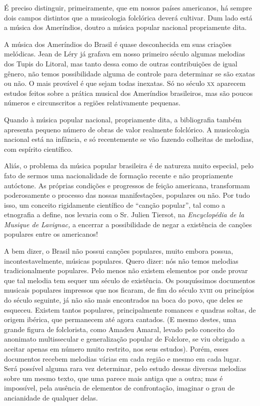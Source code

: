 É preciso distinguir, primeiramente, que em nossos países americanos, há
sempre dois campos distintos que a musicologia folclórica deverá
cultivar. Dum lado está a música dos Ameríndios, doutro a música popular
nacional propriamente dita.

A música dos Ameríndios do Brasil é quase desconhecida em suas criações
melódicas. Jean de Léry já grafava em nosso primeiro século algumas
melodias dos Tupis do Litoral, mas tanto dessa como de outras
contribuições de igual gênero, não temos possibilidade alguma de
controle para determinar se são exatas ou não. O mais provável é que
sejam todas inexatas. Só no século \textsc{xx} aparecem estudos feitos sobre a
prática musical dos Ameríndios brasileiros, mas são poucos números e
circunscritos a regiões relativamente pequenas.

Quando à música popular nacional, propriamente dita, a bibliografia
também apresenta pequeno número de obras de valor realmente folclórico.
A musicologia nacional está na infância, e só recentemente se vão
fazendo colheitas de melodias, com espírito científico.

Aliás, o problema da música popular brasileira é de natureza muito
especial, pelo fato de sermos uma nacionalidade de formação recente e
não propriamente autóctone. As próprias condições e progressos de feição
americana, transformam poderosamente o processo das nossas
manifestações, populares ou não. Por tudo isso, um conceito rigidamente
científico de ``canção popular'', tal como a etnografia a define, nos
levaria com o Sr. Julien Tiersot, na \emph{Encyclopédia de la Musique de
Lavignac,} a encerrar a possibilidade de negar a existência de canções
populares entre os americanos!

A bem dizer, o Brasil não possui canções populares, muito embora possua,
incontestavelmente, músicas populares. Quero dizer: nós não temos
melodias tradicionalmente populares. Pelo menos não existem elementos
por onde provar que tal melodia tem sequer um século de existência. Os
pouquíssimos documentos musicais populares impressos que nos ficaram, de
fim do século \textsc{xviii} ou princípios do século seguinte, já não são mais
encontrados na boca do povo, que deles se esqueceu. Existem tantos
populares, principalmente romances e quadras soltas, de origem ibérica,
que permanecem até agora cantados. (E mesmo destes, uma grande figura de
folclorista, como Amadeu Amaral, levado pelo conceito do anonimato
multissecular e generalização popular de Folclore, se viu obrigado a
aceitar apenas em número muito restrito, nos seus estudos). Porém, esses
documentos recebem melodias várias em cada região e mesmo em cada lugar.
Será possível alguma rara vez determinar, pelo estudo dessas diversas
melodias sobre um mesmo texto, que uma parece mais antiga que a outra;
mas é impossível, pela ausência de elementos de confrontação, imaginar o
grau de ancianidade de qualquer delas.

